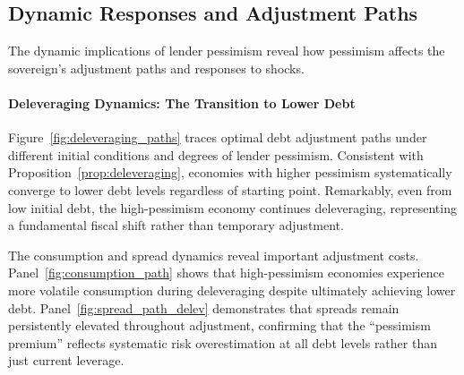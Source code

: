 \documentclass[12pt]{article}
\theoremstyle{plain}
\begin{document}
\subsection{Dynamic Responses and Adjustment Paths}

The dynamic implications of lender pessimism reveal how pessimism affects the
sovereign's adjustment paths and responses to shocks.

\paragraph{Deleveraging Dynamics: The Transition to Lower Debt}

Figure~\ref{fig:deleveraging_paths} traces optimal debt adjustment paths under
different initial conditions and degrees of lender pessimism. Consistent with
Proposition~\ref{prop:deleveraging}, economies with higher pessimism
systematically converge to lower debt levels regardless of starting point.
Remarkably, even from low initial debt, the high-pessimism economy continues
deleveraging, representing a fundamental fiscal shift rather than temporary
adjustment.

The consumption and spread dynamics reveal important adjustment costs.
Panel~\ref{fig:consumption_path} shows that high-pessimism economies experience
more volatile consumption during deleveraging despite ultimately achieving
lower debt. Panel~\ref{fig:spread_path_delev} demonstrates that spreads remain
persistently elevated throughout adjustment, confirming that the ``pessimism
premium'' reflects systematic risk overestimation at all debt levels rather
than just current leverage.
\end{document}

